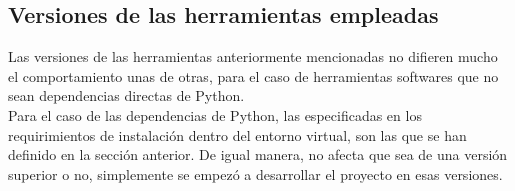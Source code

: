\subsection{Versiones de las herramientas empleadas}

Las versiones de las herramientas anteriormente mencionadas no difieren mucho el comportamiento unas de otras, para el caso de herramientas softwares que no sean dependencias directas de Python.\\

Para el caso de las dependencias de Python, las especificadas en los requirimientos de instalación dentro del entorno virtual, son las que se han definido en la sección anterior. De igual manera, no afecta que sea de una versión superior o no, simplemente se empezó a desarrollar el proyecto en esas versiones.
